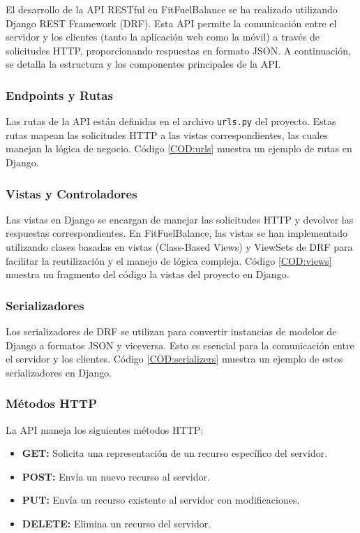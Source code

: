 El desarrollo de la API RESTful en FitFuelBalance se ha realizado utilizando Django REST Framework (DRF). Esta API permite la comunicación entre el servidor y los clientes (tanto la aplicación web como la móvil) a través de solicitudes HTTP, proporcionando respuestas en formato JSON. A continuación, se detalla la estructura y los componentes principales de la API.

\subsubsection{Endpoints y Rutas}
Las rutas de la API están definidas en el archivo \texttt{urls.py} del proyecto. Estas rutas mapean las solicitudes HTTP a las vistas correspondientes, las cuales manejan la lógica de negocio. Código \ref{COD:urls} muestra un ejemplo de rutas en Django.



\subsubsection{Vistas y Controladores}
Las vistas en Django se encargan de manejar las solicitudes HTTP y devolver las respuestas correspondientes. En FitFuelBalance, las vistas se han implementado utilizando clases basadas en vistas (Class-Based Views) y ViewSets de DRF para facilitar la reutilización y el manejo de lógica compleja. Código \ref{COD:views} muestra un fragmento del código la vistas del proyecto en Django.

\subsubsection{Serializadores}
Los serializadores de DRF se utilizan para convertir instancias de modelos de Django a formatos JSON y viceversa. Esto es esencial para la comunicación entre el servidor y los clientes. Código \ref{COD:serializers} muestra un ejemplo de estos serializadores en Django.

\subsubsection{Métodos HTTP}
La API maneja los siguientes métodos HTTP:
\begin{itemize}
    \item \textbf{GET:} Solicita una representación de un recurso específico del servidor.
    \item \textbf{POST:} Envía un nuevo recurso al servidor.
    \item \textbf{PUT:} Envía un recurso existente al servidor con modificaciones.
    \item \textbf{DELETE:} Elimina un recurso del servidor.
\end{itemize}

